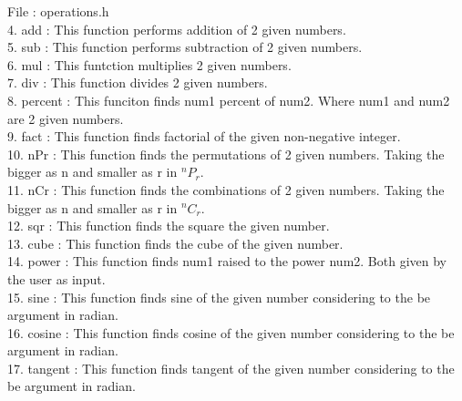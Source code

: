 \documentclass{article}
\begin{document}
File : operations.h\\
4. add : This function performs addition of 2 given numbers.\\
5. sub : This function performs subtraction of 2 given numbers.\\
6. mul : This funtction multiplies 2 given numbers.\\
7. div : This function divides 2 given numbers.\\
8. percent : This funciton finds num1 percent of num2. Where num1 and num2 are 2 given numbers.\\
9. fact : This function finds factorial of the given non-negative integer.\\
10. nPr : This function finds the permutations of 2 given numbers. Taking the bigger as n and smaller as r in $^{n}P_r$.\\
11. nCr : This function finds the combinations of 2 given numbers. Taking the bigger as n and smaller as r in $^{n}C_r$.\\
12. sqr : This function finds the square the given number. \\
13. cube : This function finds the cube of the given number.\\
14. power : This function finds num1 raised to the power num2. Both given by the user as input.\\
15. sine : This function finds sine of the given number considering to the be argument in radian.\\
16. cosine : This function finds cosine of the given number considering to the be argument in radian.\\
17. tangent : This function finds tangent of the given number considering to the be argument in radian.
\pagebreak
\end{document}
